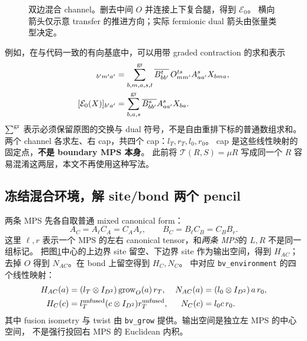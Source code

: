 \documentclass[11pt]{article}
\newcommand{\code}[1]{{\small\texttt{#1}}}
\begin{document}
\begin{figure}[htbp]\centering
{}
\caption{双边混合 channel。删去中间 $O$ 并连接上下复合腿，得到 $\mathcal E_0$。
横向箭头仅示意 transfer 的推进方向；实际 fermionic dual 箭头由张量类型决定。}
\label{fig:paired}
\end{figure}

例如，在与代码一致的有向基底中，可以用带 graded contraction 的求和表示
\begin{align}
 [\mathcal E_T(X)]_{b'm'a'}
  &=\sum_{b,m,a,s,t}^{\rm gr}
      \overline{B^t_{bb'}}\,O^{ts}_{mm'} A^s_{aa'} X_{bma},\\
 [\mathcal E_0(X)]_{b'a'}
  &=\sum_{b,a,s}^{\rm gr}\overline{B^s_{bb'}} A^s_{aa'}X_{ba}.
\end{align}
$\sum^{\rm gr}$ 表示必须保留原图的交换与 dual 符号，不是自由重排下标的普通数组求和。
两个 channel 各求左、右 cap，共四个 cap：$l_T,r_T,l_0,r_0$。
cap 是这些线性映射的固定点，\textbf{不是 boundary MPS 本身}。
此前将 $\mathcal T(R,S)=\mu R$ 写成同一个 $R$ 容易混淆这两层，本文不再使用这种写法。

\subsection{冻结混合环境，解 site/bond 两个 pencil}
两条 MPS 先各自取普通 mixed canonical form：
\begin{equation}
 A_C=A_\ell C_A=C_AA_r,\qquad
 B_C=B_\ell C_B=C_BB_r.
\end{equation}
这里 $\ell,r$ 表示一个 MPS 的左右 canonical tensor，和\emph{两条 MPS}的 $L,R$ 不是同一组标记。
把图\ref{fig:paired}中心的上边界 site 留空、下边界 site 作为输出空间，得到
$H_{AC}$；去掉 $O$ 得到 $N_{AC}$。在 bond 上留空得到 $H_C,N_C$。
 中对应
\code{bv\_environment} 的四个线性映射：
\begin{align}
 H_{AC}(a)&=(l_T\otimes I_{D^2})\,\mathrm{grow}_O(a)\,r_T,&
 N_{AC}(a)&=(l_0\otimes I_{D^2})\,a\,r_0,\\
 H_C(c)&=l_T^{\rm unfused}(c\otimes I_{D^2})r_T^{\rm unfused},&
 N_C(c)&=l_0c\,r_0.
 \label{eq:maps}
\end{align}
其中 fusion isometry 与 twist 由 \code{bv\_grow} 提供。输出空间是独立左 MPS 的中心空间，
不是强行投回右 MPS 的 Euclidean 内积。
\end{document}
